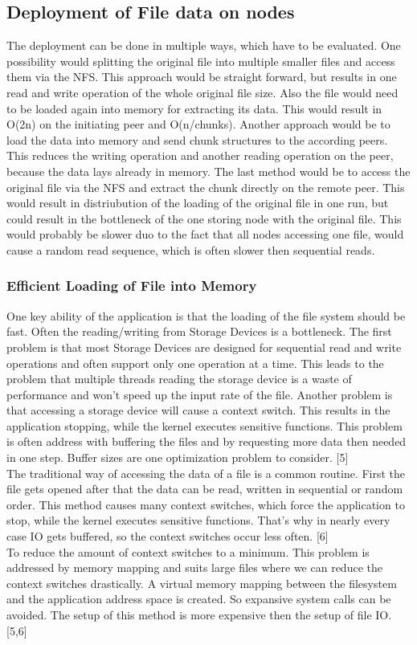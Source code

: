 \subsection{Deployment of File data on nodes}
The deployment can be done in multiple ways, which have to be evaluated. One possibility would splitting the original file into multiple smaller files and access them via the NFS. This approach would be straight forward, but results in one read and write operation of the whole original file size. Also the file would need to be loaded again into memory for extracting its data. This would result in O(2n) on the initiating peer and O(n/chunks).
Another approach would be to load the data into memory and send chunk structures to the according peers. This reduces the writing operation and another reading operation on the peer, because the data lays already in memory.
The last method would be to access the original file via the NFS and extract the chunk directly on the remote peer. This would result in distriubution of the loading of the original file in one run, but could result in the bottleneck of the one storing node with the original file. This would probably be slower duo to the fact that all nodes accessing one file, would cause a random read sequence, which is often slower then sequential reads.

\subsubsection{Efficient Loading of File into Memory}
One key ability of the application is that the loading of the file system should be fast. Often the reading/writing from Storage Devices is a bottleneck. The first problem is that most Storage Devices are designed for sequential read and write operations and often support only one operation at a time. This leads to the problem that multiple threads reading the storage device is a waste of performance and won’t speed up the input rate of the file. Another problem is that accessing a storage device will cause a context switch. This results in the application stopping, while the kernel executes sensitive functions. This problem is often address with buffering the files and by requesting more data then needed in one step. Buffer sizes are one optimization problem to consider. [5]\\
The traditional way of accessing the data of a file is a common routine. First the file gets opened after that the data can be read, written in sequential or random order. This method causes many context switches, which force the application to stop, while the kernel executes sensitive functions. That’s why in nearly every case IO gets buffered, so the context switches occur less often. [6]\\
To reduce the amount of context switches to a minimum. This problem is addressed by memory mapping and suits large files where we can reduce the context switches drastically. A virtual memory mapping between the filesystem and the application address space is created. So expansive system calls can be avoided. The setup of this method is more expensive then the setup of file IO. [5,6]\pageref{sec:FileReading}


